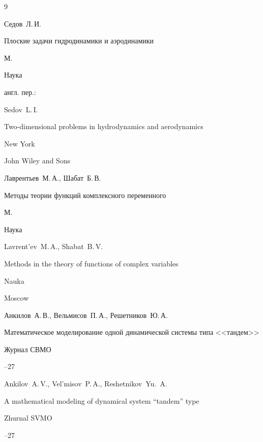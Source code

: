 \begin{thebibliography}{9}




\by Седов~Л.\,И.

\book Плоские задачи гидродинамики и аэродинамики

\publaddr М.

\publ Наука



\transl англ. пер.:~

\by Sedov~L.\,I.

\book Two-dimensional problems in hydrodynamics and aerodynamics


\publaddr New York

\publ John Wiley and Sons 





\by Лаврентьев~М.\,А., Шабат~Б.\,В.

\book Методы теории функций комплексного переменного

\publaddr М.

\publ Наука



\misctransl

Lavrent'ev~M.\,A., Shabat~B.\,V.

\book Methods in the theory of functions of complex variables 

\publ Nauka

\publaddr Moscow






\by Анкилов~А.\,В., Вельмисов~П.\,А., Решетников~Ю.\,А.

\paper Математическое моделирование одной динамической системы типа <<тандем>>

\jour Журнал СВМО




--27

\misctransl

\by Ankilov~A.\,V., Vel'misov~P.\,A., Reshetnikov~Yu.~A.

\paper A mathematical modeling of dynamical system ``tandem'' type 

\jour Zhurnal SVMO




--27



\end{thebibliography}





